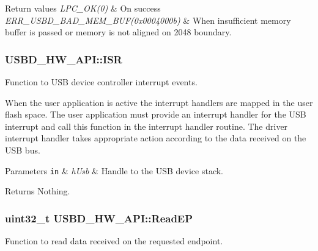 \begin{DoxyRetVals}{Return values}
{\em L\-P\-C\-\_\-\-O\-K(0)} & On success \\
\hline
{\em E\-R\-R\-\_\-\-U\-S\-B\-D\-\_\-\-B\-A\-D\-\_\-\-M\-E\-M\-\_\-\-B\-U\-F(0x0004000b)} & When insufficient memory buffer is passed or memory is not aligned on 2048 boundary. \\
\hline
\end{DoxyRetVals}
\hypertarget{structUSBD__HW__API_a692e7cd9ee17c66281daad517ab5636d}{
\subsubsection[{I\-S\-R}]{ U\-S\-B\-D\-\_\-\-H\-W\-\_\-\-A\-P\-I\-::\-I\-S\-R}}\label{structUSBD__HW__API_a692e7cd9ee17c66281daad517ab5636d}
Function to U\-S\-B device controller interrupt events.

When the user application is active the interrupt handlers are mapped in the user flash space. The user application must provide an interrupt handler for the U\-S\-B interrupt and call this function in the interrupt handler routine. The driver interrupt handler takes appropriate action according to the data received on the U\-S\-B bus.


\begin{DoxyParams}[1]{Parameters}
\mbox{\tt in}  & {\em h\-Usb} & Handle to the U\-S\-B device stack. \\
\hline
\end{DoxyParams}
\begin{DoxyReturn}{Returns}
Nothing. 
\end{DoxyReturn}
\hypertarget{structUSBD__HW__API_a637042da839963e43c354ea184582080}{
\subsubsection[{Read\-E\-P}]{\setlength{\rightskip}{0pt plus 5cm}uint32\-\_\-t U\-S\-B\-D\-\_\-\-H\-W\-\_\-\-A\-P\-I\-::\-Read\-E\-P}}\label{structUSBD__HW__API_a637042da839963e43c354ea184582080}
Function to read data received on the requested endpoint.

